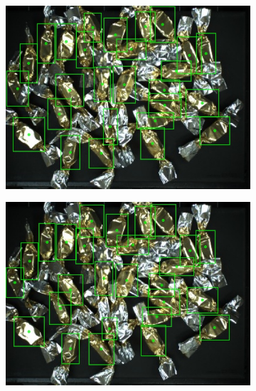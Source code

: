 \begin{figure}[ht]
\begin{subfigure}{0.5\textwidth}
  \end{subfigure}
  \begin{subfigure}{0.5\textwidth}
    \centering
    \includegraphics[width=0.92\linewidth]{Sources/Figures/appendix/actual_63.jpg}

  \end{subfigure}
  \begin{subfigure}{0.5\textwidth}
    \centering
    \includegraphics[width=0.92\linewidth]{Sources/Figures/appendix/pred_63.jpg}


\end{subfigure}
\end{figure}
